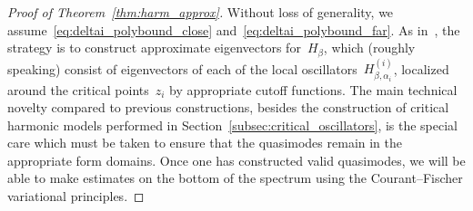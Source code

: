\documentclass[10pt]{article}
\newcommand{\1}{\mathbbm 1}
\begin{document}
    \begin{proof}[Proof of Theorem~\ref{thm:harm_approx}]
        Without loss of generality, we assume~\eqref{eq:deltai_polybound_close} and~\eqref{eq:deltai_polybound_far}.
        As in~\cite{S83}, the strategy is to construct approximate eigenvectors for~$H_\beta$, which (roughly speaking) consist of eigenvectors of each of the local oscillators~$H_{\beta,\alpha_i}^{(i)}$, localized around the critical points~$z_i$ by appropriate cutoff functions.
        The main technical novelty compared to previous constructions, besides the construction of critical harmonic models performed in Section~\ref{subsec:critical_oscillators}, is the special care which must be taken to ensure that the quasimodes remain in the appropriate form domains. Once one has constructed valid quasimodes, we will be able to make estimates on the bottom of the spectrum using the Courant--Fischer variational principles.


\end{proof}
\end{document}
